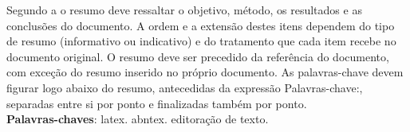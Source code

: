 \pretextual
\imprimircapa 							
\imprimirfolhaderosto						




\begin{resumo}
  Segundo a  o resumo deve ressaltar o
  objetivo, método, os resultados e as conclusões do documento. A ordem e a extensão
  destes itens dependem do tipo de resumo (informativo ou indicativo) e do
  tratamento que cada item recebe no documento original. O resumo deve ser
  precedido da referência do documento, com exceção do resumo inserido no
  próprio documento. As palavras-chave devem figurar logo abaixo do
  resumo, antecedidas da expressão Palavras-chave:, separadas entre si por
  ponto e finalizadas também por ponto.\\

  \textbf{Palavras-chaves}: latex. abntex. editoração de texto.
\end{resumo}


